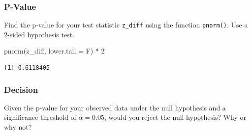 \documentclass[
  letterpaper,
  DIV=11,
  numbers=noendperiod]{scrartcl}
\newenvironment{Shaded}{\begin{snugshade}}{\end{snugshade}}
\newcommand{\AttributeTok}[1]{\textcolor[rgb]{0.40,0.45,0.13}{#1}}
\newcommand{\DecValTok}[1]{\textcolor[rgb]{0.68,0.00,0.00}{#1}}
\newcommand{\FunctionTok}[1]{\textcolor[rgb]{0.28,0.35,0.67}{#1}}
\newcommand{\NormalTok}[1]{\textcolor[rgb]{0.00,0.23,0.31}{#1}}
\newcommand{\SpecialCharTok}[1]{\textcolor[rgb]{0.37,0.37,0.37}{#1}}
\begin{document}
\subsubsection{P-Value}\label{p-value}

Find the p-value for your test statistic \texttt{z\_diff} using the
function \texttt{pnorm()}. Use a 2-sided hypothesis test.

\begin{Shaded}
\begin{Highlighting}[]
\FunctionTok{pnorm}\NormalTok{(z\_diff, }\AttributeTok{lower.tail =}\NormalTok{ F) }\SpecialCharTok{*} \DecValTok{2}
\end{Highlighting}
\end{Shaded}

\begin{verbatim}
[1] 0.6118405
\end{verbatim}

\subsubsection{Decision}\label{decision}

Given the p-value for your observed data under the null hypothesis and a
significance threshold of \(\alpha=0.05\), would you reject the null
hypothesis? Why or why not?
\end{document}
